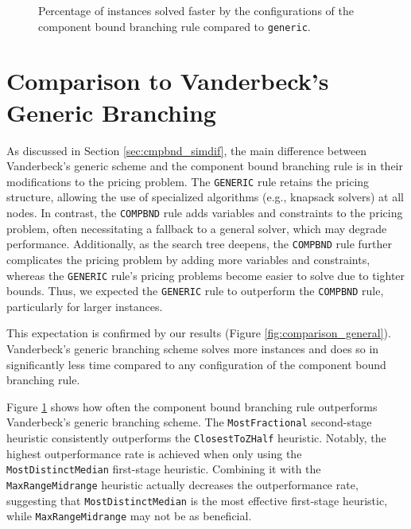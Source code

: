 \begin{figure}
	\centering

	\begin{subfigure}{0.495\textwidth}
		\centering
		
	\end{subfigure}
	\hfill
	\begin{subfigure}{0.495\textwidth}
		\centering
		
	\end{subfigure}

	\caption{Percentage of instances solved faster by the configurations of the component bound branching rule compared to \texttt{generic}.}
	\label{fig:comparison_outperform}
\end{figure}

\section{Comparison to Vanderbeck's Generic Branching}\label{sec:evaluation_comparison_generic}
As discussed in Section \ref{sec:cmpbnd_simdif}, the main difference between Vanderbeck's generic scheme and the component bound branching rule is in their modifications to the pricing problem. The \texttt{GENERIC} rule retains the pricing structure, allowing the use of specialized algorithms (e.g., knapsack solvers) at all nodes. In contrast, the \texttt{COMPBND} rule adds variables and constraints to the pricing problem, often necessitating a fallback to a general \MIP{} solver, which may degrade performance. Additionally, as the search tree deepens, the \texttt{COMPBND} rule further complicates the pricing problem by adding more variables and constraints, whereas the \texttt{GENERIC} rule's pricing problems become easier to solve due to tighter bounds. Thus, we expected the \texttt{GENERIC} rule to outperform the \texttt{COMPBND} rule, particularly for larger instances.

This expectation is confirmed by our results (Figure \ref{fig:comparison_general}). Vanderbeck's generic branching scheme solves more instances and does so in significantly less time compared to any configuration of the component bound branching rule.

Figure \ref{fig:comparison_outperform} shows how often the component bound branching rule outperforms Vanderbeck's generic branching scheme. The \texttt{MostFractional} second-stage heuristic consistently outperforms the \texttt{ClosestToZHalf} heuristic. Notably, the highest outperformance rate is achieved when only using the \texttt{MostDistinctMedian} first-stage heuristic. Combining it with the \texttt{MaxRangeMidrange} heuristic actually decreases the outperformance rate, suggesting that \texttt{MostDistinctMedian} is the most effective first-stage heuristic, while \texttt{MaxRangeMidrange} may not be as beneficial.


